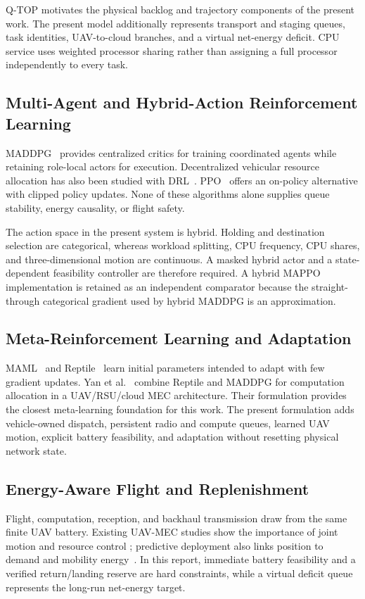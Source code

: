 \documentclass[journal]{IEEEtran}
\begin{document}
Q-TOP motivates the physical backlog and trajectory components of the
present work.  The present model additionally represents transport and
staging queues, task identities, UAV-to-cloud branches, and a virtual
net-energy deficit.  CPU service uses weighted processor sharing rather
than assigning a full processor independently to every task.

\subsection{Multi-Agent and Hybrid-Action Reinforcement Learning}
MADDPG~\cite{lowe2017multi} provides centralized critics for training
coordinated agents while retaining role-local actors for execution.
Decentralized vehicular resource allocation has also been studied with
DRL~\cite{ye2021deep}.  PPO~\cite{schulman2017proximal} offers an
on-policy alternative with clipped policy updates.  None of these
algorithms alone supplies queue stability, energy causality, or flight
safety.

The action space in the present system is hybrid.  Holding and
destination selection are categorical, whereas workload splitting,
CPU frequency, CPU shares, and three-dimensional motion are
continuous.  A masked hybrid actor and a state-dependent feasibility
controller are therefore required.  A hybrid MAPPO implementation is
retained as an independent comparator because the straight-through
categorical gradient used by hybrid MADDPG is an approximation.

\subsection{Meta-Reinforcement Learning and Adaptation}
MAML~\cite{finn2017model} and Reptile~\cite{nichol2018reptile} learn
initial parameters intended to adapt with few gradient updates.
Yan et al.~\cite{yan2026rmaddpg} combine Reptile and MADDPG for
computation allocation in a UAV/RSU/cloud MEC architecture.  Their
formulation provides the closest meta-learning foundation for this
work.  The present formulation adds vehicle-owned dispatch, persistent
radio and compute queues, learned UAV motion, explicit battery
feasibility, and adaptation without resetting physical network state.

\subsection{Energy-Aware Flight and Replenishment}
Flight, computation, reception, and backhaul transmission draw from
the same finite UAV battery.  Existing UAV-MEC studies show the
importance of joint motion and resource control
\cite{zhang2019mobile,liu2020uav}; predictive deployment also links
position to demand and mobility energy~\cite{zhang2020uav}.  In this
report, immediate battery feasibility and a verified return/landing
reserve are hard constraints, while a virtual deficit queue represents
the long-run net-energy target.
\end{document}
